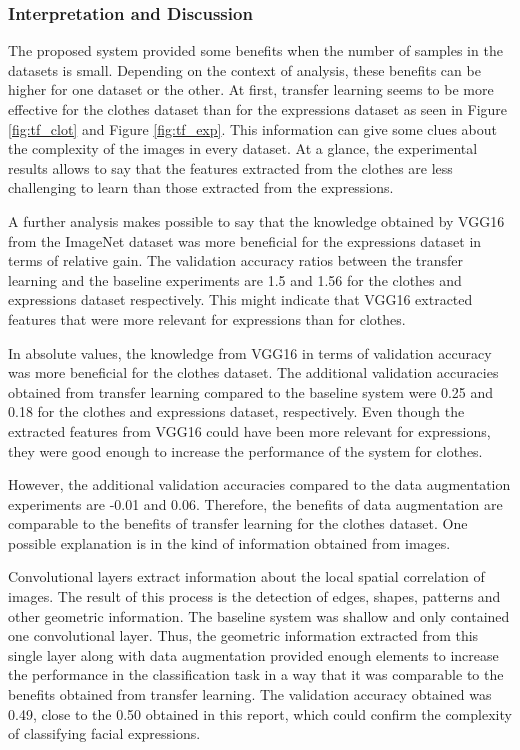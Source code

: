 \documentclass{article}
\begin{document}
\subsubsection{\textbf{Interpretation and Discussion}}

The proposed system provided some benefits when the number of samples in the datasets is small. Depending on the context of analysis, these benefits can be higher for one dataset or the other. At first, transfer learning seems to be more effective for the clothes dataset than for the expressions dataset as seen in Figure \ref{fig:tf_clot} and Figure \ref{fig:tf_exp}. This information can give some clues about the complexity of the images in every dataset. At a glance, the experimental results allows to say that the features extracted from the clothes are less challenging to learn than those extracted from the expressions.

A further analysis makes possible to say that the knowledge obtained by VGG16 from the ImageNet dataset was more beneficial for the expressions dataset in terms of relative gain. The validation accuracy ratios between the transfer learning and the baseline experiments are 1.5 and 1.56 for the clothes and expressions dataset respectively. This might indicate that VGG16 extracted features that were more relevant for expressions than for clothes.

In absolute values, the knowledge from VGG16 in terms of validation accuracy was more beneficial for the clothes dataset. The additional validation accuracies obtained from transfer learning compared to the baseline system were 0.25 and 0.18 for the clothes and expressions dataset, respectively. Even though the extracted features from VGG16 could have been more relevant for expressions, they were good enough to increase the performance of the system for clothes.

However, the additional validation accuracies compared to the data augmentation experiments are -0.01 and 0.06. Therefore, the benefits of data augmentation are comparable to the benefits of transfer learning for the clothes dataset. One possible explanation is in the kind of information obtained from images. 

Convolutional layers extract information about the local spatial correlation of images. The result of this process is the detection of edges, shapes, patterns and other geometric information. The baseline system was shallow and only contained one convolutional layer. Thus, the geometric information extracted from this single layer along with data augmentation provided enough elements to increase the performance in the classification task in a way that it was comparable to the benefits obtained from transfer learning. The validation accuracy obtained was 0.49, close to the 0.50 obtained in this report, which could confirm the complexity of classifying facial expressions.
\end{document}
